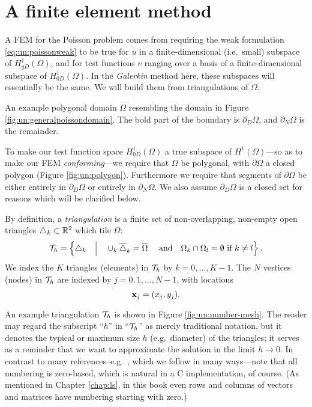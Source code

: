 \section{A finite element method}

A FEM for the Poisson problem comes from requiring the weak formulation \eqref{eq:un:poissonweak} to be true for $u$ in a finite-dimensional (i.e.~small) subspace of $H_{gD}^1(\Omega)$, and for test functions $v$ ranging over a basis of a finite-dimensional subspace of $H_{0D}^1(\Omega)$.  In the \emph{Galerkin} method here, these subspaces will essentially be the same.  We will build them from triangulations of $\Omega$.

\begin{marginfigure}

\caption{An example polygonal domain $\Omega$ resembling the domain in Figure \ref{fig:un:generalpoissondomain}.  The bold part of the boundary is $\partial_D\Omega$, and $\partial_N\Omega$ is the remainder.}
\label{fig:un:polygon}
\end{marginfigure}

To make our test function space $H_{0D}^1(\Omega)$ a true subspace of $H^1(\Omega)$---so as to make our FEM \emph{conforming}---we require that $\Omega$ be polygonal, with $\partial\Omega$ a closed polygon (Figure \ref{fig:un:polygon}).  Furthermore we require that segments of $\partial\Omega$ be either entirely in $\partial_D\Omega$ or entirely in $\partial_N\Omega$.  We also assume $\partial_D\Omega$ is a closed set for reasons which will be clarified below.

By definition, a \emph{triangulation} is a finite set of non-overlapping, non-empty open triangles $\triangle_k\subset \mathbb{R}^2$ which tile $\Omega$:
\begin{equation*}
\mathcal{T}_h = \left\{\triangle_k \quad\Big|\quad \cup_k \overline{\triangle}_k = \overline{\Omega} \quad \text{ and} \quad \Omega_k \cap \Omega_l = \emptyset \text{ if } k\ne l\right\}.
\end{equation*}
We index the $K$ triangles (elements) in $\mathcal{T}_h$ by $k=0,\dots,K-1$.  The $N$ vertices (nodes) in $\mathcal{T}_h$ are indexed by $j=0,1,\dots,N-1$, with locations
\begin{equation*}
\mathbf{x}_j = (x_j,y_j).
\end{equation*}

An example triangulation $\mathcal{T}_h$ is shown in Figure \ref{fig:un:number-mesh}.  The reader may regard the subscript ``$h$'' in ``$\mathcal{T}_h$'' as merely traditional notation, but it denotes the typical or maximum size $h$ (e.g.~diameter) of the triangles; it serves as a reminder that we want to approximate the solution in the limit $h\to 0$.  In contrast to many references--e.g.~\citet{Elmanetal2005}, which we follow in many ways---note that all numbering is zero-based, which is natural in a C implementation, of course.  (As mentioned in Chapter \ref{chap:ls}, in this book even rows and columns of vectors and matrices have numbering starting with zero.)

